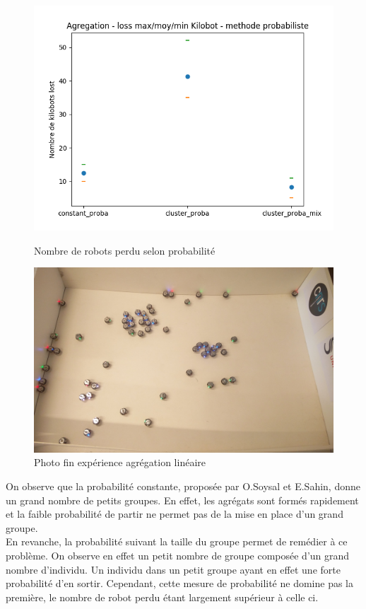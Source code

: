 \documentclass[a4paper]{article}
\begin{document}
\begin{figure}[h]
	\centering
	\begin{minipage}[c]{.46\linewidth}
		\centering
		\includegraphics[width=1.1\linewidth]{../../script_results/Agregation_nombre_lost.png}
		\caption{Nombre de robots perdu selon probabilité}
	\end{minipage}
\hfill
	\begin{minipage}[c]{.45\linewidth}
	\centering
	\includegraphics[width=1.1\linewidth]{../../script_results/Resultats_aggregation_proba.jpg}
	\caption{Photo fin expérience agrégation linéaire}
\end{minipage}
\end{figure}
\newpage
%
On observe que la probabilité constante, proposée par O.Soysal et E.Sahin, donne un grand nombre de petits groupes. En effet, les agrégats sont formés rapidement et la faible probabilité de partir ne permet pas de la mise en place d'un grand groupe.\\
En revanche, la probabilité suivant la taille du groupe permet de remédier à ce problème. On observe en effet un petit nombre de groupe composée d'un grand nombre d'individu. Un individu dans un petit groupe ayant en effet une forte probabilité d'en sortir. Cependant, cette mesure de probabilité ne domine pas la première, le nombre de robot perdu étant largement supérieur à celle ci.\\
\newpage
\end{document}
